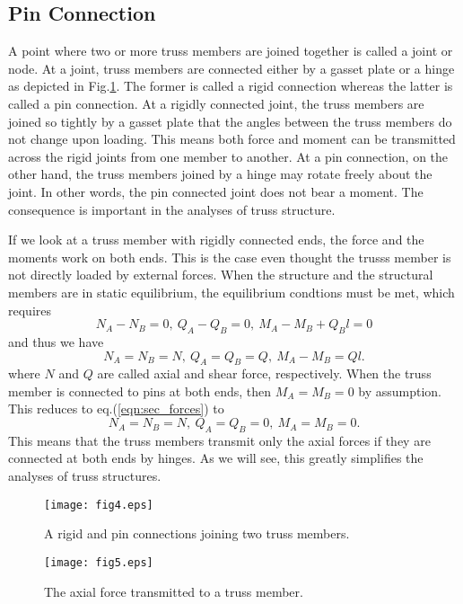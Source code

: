 \documentclass[10pt,a4j]{article}
\begin{document}
\subsection{Pin Connection}
A point where two or more truss members are joined together is called a joint or node. 
At a joint,  truss members are connected either by a gasset plate or a hinge as depicted 
in Fig.\ref{fig:fig4}. The former is called a rigid connection whereas the latter is called 
a pin connection. At a rigidly connected  joint, the truss members are joined 
so tightly by a gasset plate that the angles between the truss members do not 
change upon loading. This means both force and moment can be transmitted across 
the rigid joints from one member to another. 
At a pin connection, on the other hand, the truss members joined by a hinge may rotate 
freely about the joint. In other words, the pin connected joint does not bear a moment. 
The consequence is important in the analyses of truss structure. 

If we look at a truss member with rigidly connected ends, 
the force and the moments work on both ends. This is the case 
even thought the trusss member is not directly loaded by external forces. 
When the structure and the structural members are in static equilibrium, the 
equilibrium condtions must be met, which requires
\begin{equation}
	N_A-N_B=0, \ Q_A-Q_B=0, \  M_A-M_B+Q_Bl=0 
	\label{eqn:}
\end{equation}
\begin{equation}
\end{equation}
and thus we have
\begin{equation}
	N_A=N_B=N,\  Q_A=Q_B=Q, \  M_A-M_B=Ql.
	\label{eqn:sec_forces}
\end{equation}
where $N$ and $Q$ are called axial and shear force, respectively.
When the truss member is connected to pins at both ends, then 
$M_A=M_B=0$ by assumption. This reduces to eq.(\ref{eqn:sec_forces}) 
to 
\begin{equation}
	N_A=N_B=N,\  Q_A=Q_B=0, \  M_A=M_B=0.
	\label{eqn:sec_forces}
\end{equation}
This means that the truss members transmit only the axial forces 
 if they are connected at both ends by hinges. As we will see, this 
 greatly simplifies the analyses of truss structures. 
\begin{figure}[h]
	\begin{center}
	\texttt{[image: fig4.eps]} 
	\end{center}
	\caption{A rigid and pin connections joining two truss members.} 
	\label{fig:fig4}
\end{figure}
\begin{figure}[h]
	\begin{center}
	\texttt{[image: fig5.eps]} 
	\end{center}
	\caption{The axial force transmitted to a truss member.}
	\label{fig:fig5}
\end{figure}
%
%
\end{document}
